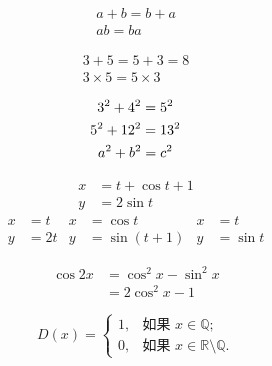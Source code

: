 \documentclass{article}
\begin{document}
	\begin{gather}
		a + b = b + a\\
		ab = ba
	\end{gather}

	\begin{gather*}
		3 + 5 = 5 + 3 = 8\\
		3 \times 5 = 5 \times 3
	\end{gather*}

	\begin{gather}
		3 ^ 2 + 4 ^ 2 = 5 ^ 2 \notag \\
		5 ^ 2 + 12 ^ 2 = 13 ^ 2 \notag \\
		a ^ 2 + b ^ 2 = c ^ 2
	\end{gather}
	
	\begin{align}
		x &= t + \cos t + 1 \\
		y &= 2\sin t
	\end{align}
	\begin{align*}
		x &= t & x &= \cos t & x &= t \\
		y &= 2t & y &= \sin(t+1) & y &= \sin t
	\end{align*}
	
	\begin{equation}
		\begin{split}
			\cos 2x &= \cos^2 x - \sin^2 x \\
			&= 2\cos^2 x - 1
		\end{split}
	\end{equation}

	\begin{equation}
		D(x) = \begin{cases}
			1, & \text{如果 } x \in \mathbb{Q}; \\
			0, & \text{如果 } x \in
			\mathbb{R}\setminus\mathbb{Q}.
		\end{cases}
	\end{equation}
\end{document}
